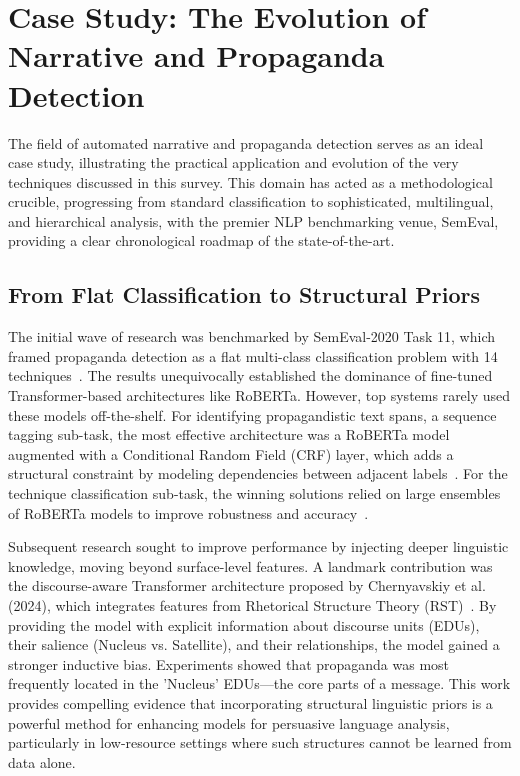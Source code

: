 \section{Case Study: The Evolution of Narrative and Propaganda Detection}
The field of automated narrative and propaganda detection serves as an ideal case study, illustrating the practical application and evolution of the very techniques discussed in this survey. This domain has acted as a methodological crucible, progressing from standard classification to sophisticated, multilingual, and hierarchical analysis, with the premier NLP benchmarking venue, SemEval, providing a clear chronological roadmap of the state-of-the-art.

\subsection{From Flat Classification to Structural Priors}
The initial wave of research was benchmarked by SemEval-2020 Task 11, which framed propaganda detection as a flat multi-class classification problem with 14 techniques~\cite{SemEval2020Task11}. The results unequivocally established the dominance of fine-tuned Transformer-based architectures like RoBERTa. However, top systems rarely used these models off-the-shelf. For identifying propagandistic text spans, a sequence tagging sub-task, the most effective architecture was a RoBERTa model augmented with a Conditional Random Field (CRF) layer, which adds a structural constraint by modeling dependencies between adjacent labels~\cite{chernyavskiy-etal-2020-aschern, jurkiewicz-etal-2020-applicaai}. For the technique classification sub-task, the winning solutions relied on large ensembles of RoBERTa models to improve robustness and accuracy~\cite{jurkiewicz-etal-2020-applicaai}.

Subsequent research sought to improve performance by injecting deeper linguistic knowledge, moving beyond surface-level features. A landmark contribution was the discourse-aware Transformer architecture proposed by Chernyavskiy et al. (2024), which integrates features from Rhetorical Structure Theory (RST)~\cite{chernyavskiy-etal-2024-unleashing}. By providing the model with explicit information about discourse units (EDUs), their salience (Nucleus vs. Satellite), and their relationships, the model gained a stronger inductive bias. Experiments showed that propaganda was most frequently located in the 'Nucleus' EDUs---the core parts of a message. This work provides compelling evidence that incorporating structural linguistic priors is a powerful method for enhancing models for persuasive language analysis, particularly in low-resource settings where such structures cannot be learned from data alone.

